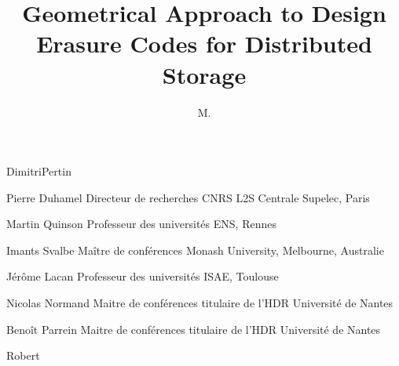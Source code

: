 

\title{Geometrical Approach to Design Erasure Codes for Distributed Storage}

\author{M.}{Dimitri}{Pertin}






\thesisnumber{}

\date{}

    {Pierre}
    {Duhamel}
    {Directeur de recherches CNRS}
    {L2S Centrale Supelec, Paris}

    {Martin}
    {Quinson}
    {Professeur des universités}
    {ENS, Rennes}

    {Imants}
    {Svalbe}
    {Maître de conférences}
    {Monash University, Melbourne, Australie}

    {Jérôme}
    {Lacan}
    {Professeur des universités}
    {ISAE, Toulouse}

    {Nicolas}
    {Normand}
    {Maitre de conférences titulaire de l'HDR}
    {Université de Nantes}
 
    {Benoît}
    {Parrein}
    {Maitre de conférences titulaire de l'HDR}
    {Université de Nantes}   



\begin{resume}
\end{resume}

\begin{motscles}
    Robert
\end{motscles}

\begin{abstract}
\end{abstract}

